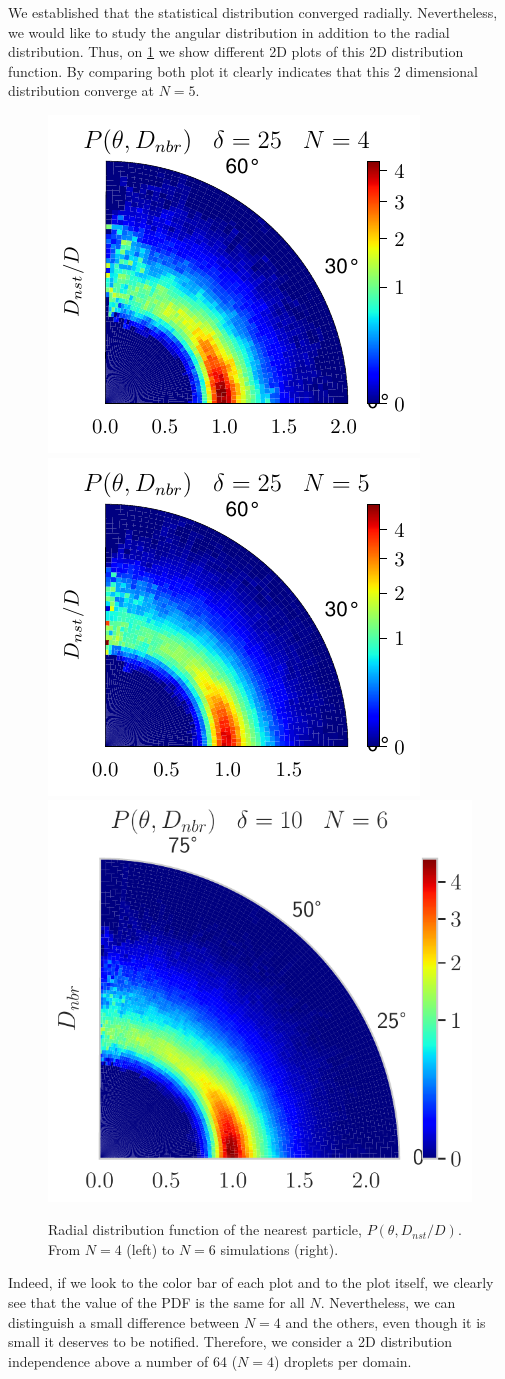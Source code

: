 We established that the statistical distribution converged radially. 
Nevertheless, we would like to study the angular distribution in addition to the radial distribution.  
Thus, on \ref{fig:VALIDATION_fDrop_3} we show different 2D plots of this 2D distribution function. 
By comparing both plot it clearly indicates that this 2 dimensional distribution converge at $N=5$. 
\begin{figure}[h!]
    \centering
    \includegraphics[height= 0.3\textwidth]{image/VALIDATION/fDrop/U_Theta_ndc_25_N_4.pdf}
    \includegraphics[height= 0.3\textwidth]{image/VALIDATION/fDrop/U_Theta_ndc_25_N_5.pdf}
    \includegraphics[height= 0.3\textwidth]{image/VALIDATION/fDrop/U_Theta_ndc_10_N_6.pdf}
    \caption{Radial distribution function of the nearest particle, $P(\theta, D_{nst}/D)$. 
    From $N=4$ (left) to $N=6$ simulations (right).}
    \label{fig:VALIDATION_fDrop_3}
\end{figure}
Indeed, if we look to the color bar of each plot and to the plot itself, we clearly see that the value of the PDF is the same for all $N$. 
Nevertheless, we can distinguish a small difference between $N=4$ and the others, even though it is small it deserves to be notified. 
Therefore, we consider a 2D distribution independence above a number of 64 ($N=4$) droplets per domain. 


